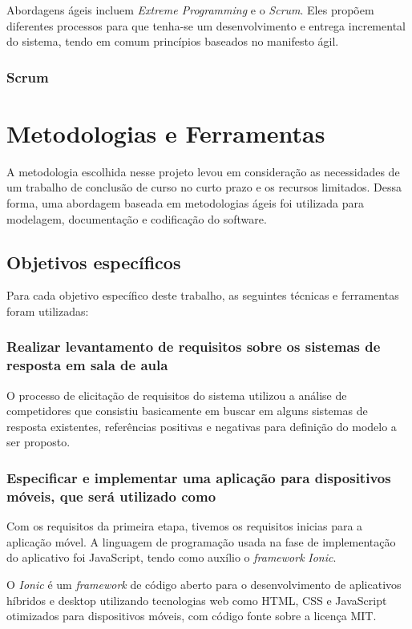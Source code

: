 Abordagens ágeis incluem \textit{Extreme Programming} e o \textit{Scrum}. Eles propõem diferentes processos
para que tenha-se um desenvolvimento e entrega incremental do sistema, tendo em comum princípios
baseados no manifesto ágil.

\subsubsection{Scrum}


\section{Metodologias e Ferramentas}
A metodologia escolhida nesse projeto levou em consideração as necessidades de um trabalho de
conclusão de curso no curto prazo e os recursos limitados. Dessa forma, uma abordagem baseada
em metodologias ágeis foi utilizada para modelagem, documentação e codificação do software.

\subsection{Objetivos específicos}

Para cada objetivo específico deste trabalho, as seguintes técnicas e ferramentas foram utilizadas:

\subsubsection{Realizar levantamento de requisitos sobre os sistemas de resposta em sala de aula}

O processo de elicitação de requisitos do sistema utilizou a análise de competidores que
consistiu basicamente em buscar em alguns sistemas de resposta existentes, referências positivas e
negativas para definição do modelo a ser proposto.

\subsubsection{Especificar e implementar uma aplicação para dispositivos móveis, que será utilizado como {\clickers}}

Com os requisitos da primeira etapa, tivemos os requisitos inicias para a aplicação móvel.
A linguagem de programação usada na fase de implementação do aplicativo foi JavaScript, tendo como auxílio o \textit{framework} \textit{Ionic}.

O \textit{Ionic} é um \textit{framework} de código aberto para o desenvolvimento de aplicativos híbridos e desktop utilizando
tecnologias web como HTML, CSS e JavaScript otimizados para dispositivos móveis, com código fonte sobre a licença MIT.

